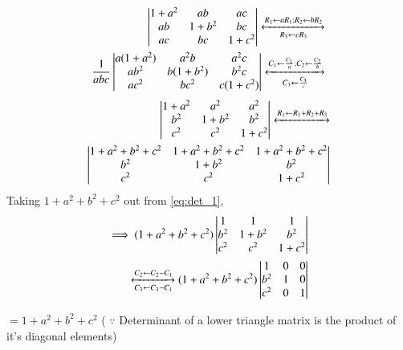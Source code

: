 \begin{align}
    \begin{vmatrix}1+a^2 & ab & ac \\ ab & 1+b^2 & bc \\ ac & bc & 1+c^2\end{vmatrix} \xleftrightarrow[R_3 \leftarrow cR_3]{R_1 \leftarrow aR_1; R_2 \leftarrow bR_2} \nonumber \\ 
    \frac{1}{abc}\begin{vmatrix}a(1+a^2) & a^2b & a^2c \\ ab^2 & b(1+b^2) & b^2c \\ ac^2 & bc^2 & c(1+c^2)\end{vmatrix} \xleftrightarrow[C_3 \leftarrow \frac{C_3}{c}]{C_1 \leftarrow \frac{C_1}{a}; C_2 \leftarrow \frac{C_2}{b}} \nonumber
\end{align}
\begin{align} \label{eq:det_1}
        \begin{vmatrix}1+a^2 & a^2 & a^2 \\ b^2 & 1+b^2 & b^2 \\ c^2 & c^2 & 1+c^2\end{vmatrix} \xleftrightarrow[]{R_1 \leftarrow R_1+R_2+R_3} \nonumber \\ \begin{vmatrix}1+a^2+b^2+c^2 & 1+a^2+b^2+c^2 & 1+a^2+b^2+c^2 \\ b^2 & 1+b^2 & b^2 \\ c^2 & c^2 & 1+c^2\end{vmatrix}
\end{align}
Taking $1+a^2+b^2+c^2$ out from \eqref{eq:det_1},
\begin{align}
    \implies(1+a^2+b^2+c^2) \begin{vmatrix}1 & 1 & 1 \\ b^2 & 1+b^2 & b^2 \\ c^2 & c^2 & 1+c^2\end{vmatrix} \nonumber \\ \xleftrightarrow[C_3 \leftarrow C_3-C_1]{C_2 \leftarrow C_2-C_1} (1+a^2+b^2+c^2)\begin{vmatrix}1 & 0 & 0 \\ b^2 & 1 & 0 \\ c^2 & 0 & 1\end{vmatrix} \nonumber
\end{align}

    $= 1+a^2+b^2+c^2$ ( $\because$ Determinant of a lower triangle matrix is the product of it's diagonal elements)  
